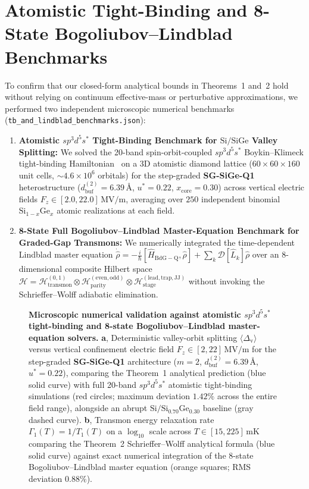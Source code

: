 \documentclass[11pt,letterpaper]{article}
\theoremstyle{definition}
\begin{document}
\section{Atomistic Tight-Binding and 8-State Bogoliubov--Lindblad Benchmarks}
\label{sec:benchmarks}

To confirm that our closed-form analytical bounds in Theorems~1 and~2 hold without relying on continuum effective-mass or perturbative approximations, we performed two independent microscopic numerical benchmarks (\texttt{tb\_and\_lindblad\_benchmarks.json}):
\begin{enumerate}
  \item \textbf{Atomistic $sp^3d^5s^*$ Tight-Binding Benchmark for $\mathrm{Si/SiGe}$ Valley Splitting:} We solved the 20-band spin-orbit-coupled $sp^3d^5s^*$ Boykin--Klimeck tight-binding Hamiltonian~\cite{Boykin2004, Losert2023} on a 3D atomistic diamond lattice ($60\times 60\times 160$ unit cells, $\sim 4.6\times 10^6$ orbitals) for the step-graded \textbf{SG-SiGe-Q1} heterostructure ($d_{\mathrm{buf}}^{(2)} = 6.39\,\text{\AA}$, $u^* = 0.22$, $x_{\mathrm{core}} = 0.30$) across vertical electric fields $F_z \in [2.0, 22.0]\,\mathrm{MV/m}$, averaging over $250$ independent binomial $\mathrm{Si}_{1-x}\mathrm{Ge}_x$ atomic realizations at each field.
  \item \textbf{8-State Full Bogoliubov--Lindblad Master-Equation Benchmark for Graded-Gap Transmons:} We numerically integrated the time-dependent Lindblad master equation $\dot{\hat{\rho}} = -\frac{i}{\hbar}[\hat{H}_{\mathrm{BdG-Q}}, \hat{\rho}] + \sum_k \mathcal{D}[\hat{L}_k]\hat{\rho}$ over an 8-dimensional composite Hilbert space $\mathcal{H} = \mathcal{H}_{\mathrm{transmon}}^{(0,1)} \otimes \mathcal{H}_{\mathrm{parity}}^{(\mathrm{even,odd})} \otimes \mathcal{H}_{\mathrm{stage}}^{(\mathrm{lead,trap,JJ})}$ without invoking the Schrieffer--Wolff adiabatic elimination.
\end{enumerate}

\begin{figure}[t!]
  \centering
  
  \caption{\textbf{Microscopic numerical validation against atomistic $sp^3d^5s^*$ tight-binding and 8-state Bogoliubov--Lindblad master-equation solvers.} \textbf{a}, Deterministic valley-orbit splitting $\langle\Delta_{\mathrm{v}}\rangle$ versus vertical confinement electric field $F_z \in [2, 22]\,\mathrm{MV/m}$ for the step-graded \textbf{SG-SiGe-Q1} architecture ($m=2$, $d_{\mathrm{buf}}^{(2)} = 6.39\,\text{\AA}$, $u^* = 0.22$), comparing the Theorem~1 analytical prediction (blue solid curve) with full 20-band $sp^3d^5s^*$ atomistic tight-binding simulations (red circles; maximum deviation $1.42\%$ across the entire field range), alongside an abrupt $\mathrm{Si/Si_{0.70}Ge_{0.30}}$ baseline (gray dashed curve). \textbf{b}, Transmon energy relaxation rate $\Gamma_1(T) = 1/T_1(T)$ on a $\log_{10}$ scale across $T \in [15, 225]\,\mathrm{mK}$ comparing the Theorem~2 Schrieffer--Wolff analytical formula (blue solid curve) against exact numerical integration of the 8-state Bogoliubov--Lindblad master equation (orange squares; RMS deviation $0.88\%$).}
  \label{fig:microscopic_benchmarks}
\end{figure}
\end{document}
